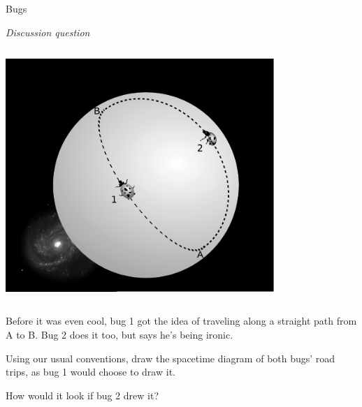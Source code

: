 \begin{frame}{Bugs}

\emph{Discussion question}

  \begin{mycolumns}

    \begin{column}{.4\textwidth}\includegraphics[width=4in]{ch09/figs/parable-of-the-bugs.png}\end{column}

    \begin{column}{.6\textwidth}

      Before it was even cool, bug 1 got the idea of traveling along a straight path from A to B.
      Bug 2 does it too, but says he's being ironic.

      \vspace{2mm}

      Using our usual conventions, draw the spacetime diagram of both bugs' road trips, as bug 1 would choose
      to draw it.

      \vspace{2mm}

      How would it look if bug 2 drew it?

    \end{column}
  \end{mycolumns}

\end{frame}
